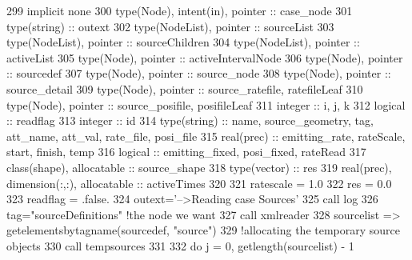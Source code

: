 \begin{DoxyCode}
299     \textcolor{keywordtype}{implicit none}
300     \textcolor{keywordtype}{type}(Node), \textcolor{keywordtype}{intent(in)}, \textcolor{keywordtype}{pointer} :: case\_node
301     \textcolor{keywordtype}{type}(string) :: outext
302     \textcolor{keywordtype}{type}(NodeList), \textcolor{keywordtype}{pointer} :: sourceList
303     \textcolor{keywordtype}{type}(NodeList), \textcolor{keywordtype}{pointer} :: sourceChildren
304     \textcolor{keywordtype}{type}(NodeList), \textcolor{keywordtype}{pointer} :: activeList
305     \textcolor{keywordtype}{type}(Node), \textcolor{keywordtype}{pointer} :: activeIntervalNode
306     \textcolor{keywordtype}{type}(Node), \textcolor{keywordtype}{pointer} :: sourcedef
307     \textcolor{keywordtype}{type}(Node), \textcolor{keywordtype}{pointer} :: source\_node
308     \textcolor{keywordtype}{type}(Node), \textcolor{keywordtype}{pointer} :: source\_detail
309     \textcolor{keywordtype}{type}(Node), \textcolor{keywordtype}{pointer} :: source\_ratefile, ratefileLeaf
310     \textcolor{keywordtype}{type}(Node), \textcolor{keywordtype}{pointer} :: source\_posifile, posifileLeaf
311     \textcolor{keywordtype}{integer} :: i, j, k
312     \textcolor{keywordtype}{logical} :: readflag
313     \textcolor{keywordtype}{integer} :: id
314     \textcolor{keywordtype}{type}(string) :: name, source\_geometry, tag, att\_name, att\_val, rate\_file, posi\_file
315     \textcolor{keywordtype}{real(prec)} :: emitting\_rate, rateScale, start, finish, temp
316     \textcolor{keywordtype}{logical} :: emitting\_fixed, posi\_fixed, rateRead
317     \textcolor{keywordtype}{class}(shape), \textcolor{keywordtype}{allocatable} :: source\_shape
318     \textcolor{keywordtype}{type}(vector) :: res
319     \textcolor{keywordtype}{real(prec)}, \textcolor{keywordtype}{dimension(:,:)}, \textcolor{keywordtype}{allocatable} :: activeTimes
320 
321     ratescale = 1.0
322     res = 0.0    
323     readflag = .false.
324     outext=\textcolor{stringliteral}{'-->Reading case Sources'}
325     \textcolor{keyword}{call }log%
326     tag=\textcolor{stringliteral}{"sourceDefinitions"}    \textcolor{comment}{!the node we want}
327     \textcolor{keyword}{call }xmlreader%
328     sourcelist => getelementsbytagname(sourcedef, \textcolor{stringliteral}{"source"})
329     \textcolor{comment}{!allocating the temporary source objects}
330     \textcolor{keyword}{call }tempsources%
331 
332     \textcolor{keywordflow}{do} j = 0, getlength(sourcelist) - 1

\end{DoxyCode}
